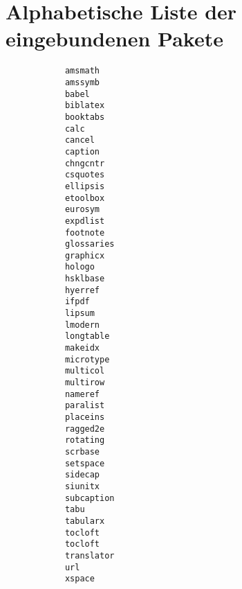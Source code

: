 \section{Alphabetische Liste der eingebundenen Pakete}

\begin{minipage}{\textwidth}
	\begin{multicols}{5}
		\begin{verbatim}
			amsmath
			amssymb
			babel
			biblatex
			booktabs
			calc
			cancel
			caption
			chngcntr
			csquotes
			ellipsis
			etoolbox
			eurosym
			expdlist
			footnote
			glossaries
			graphicx
			hologo
			hsklbase
			hyerref
			ifpdf
			lipsum
			lmodern
			longtable
			makeidx
			microtype
			multicol
			multirow
			nameref
			paralist
			placeins
			ragged2e
			rotating
			scrbase
			setspace
			sidecap
			siunitx
			subcaption
			tabu
			tabularx
			tocloft
			tocloft
			translator
			url
			xspace
		\end{verbatim}
	\end{multicols}
\end{minipage}
